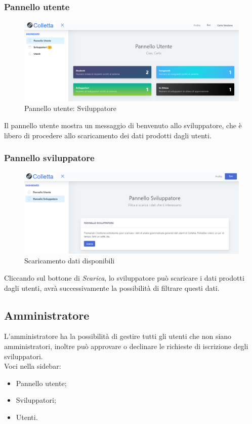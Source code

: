     
    
    
    	\subsubsection{Pannello utente}
    				\begin{figure}[H]
				\centering
				\includegraphics[width=17cm]{sez/img/amministratore/panelloadmin.PNG}
				\caption{Pannello utente: Sviluppatore}\label{fig:1}
			\end{figure}
    	  Il pannello utente mostra un messaggio di benvenuto allo sviluppatore, che è libero di procedere allo scaricamento dei dati prodotti dagli utenti.



    	\subsubsection{Pannello sviluppatore}
    		\begin{figure}[H]
				\centering
				\includegraphics[width=17cm]{sez/img/sviluppatore/datipronti.png}
				\caption{Scaricamento dati disponibili}\label{fig:1}
			\end{figure}
		  Cliccando sul bottone di \textit{Scarica}, lo sviluppatore può scaricare i dati prodotti dagli utenti, avrà successivamente la possibilità di filtrare questi dati.




	\newpage
	\subsection{Amministratore}
	L'amministratore ha la possibilità di gestire tutti gli utenti che non siano amministratori, inoltre può approvare o declinare le richieste di iscrizione degli sviluppatori.
		  \\Voci nella sidebar:
			\begin{itemize}
				\item Pannello utente;
				\item Sviluppatori;
				\item Utenti.
			\end{itemize}



